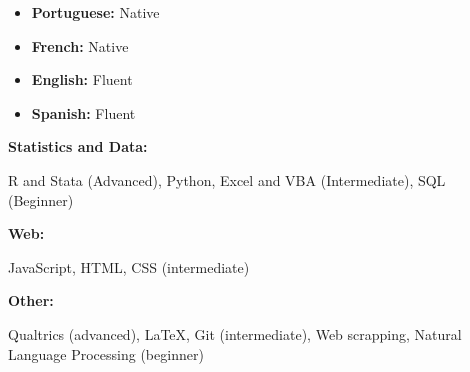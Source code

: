\documentclass[9pt]{developercv} %
\begin{document}
\vspace{-10 pt}
\begin{minipage}[t]{0.25\textwidth}
	\vspace{-15pt}
    \begin{itemize}[noitemsep]
        \item \textbf{Portuguese:} Native
        \item \textbf{French:} Native
        \item \textbf{English:} Fluent
        \item \textbf{Spanish:} Fluent
        \end{itemize}
\end{minipage}
\hfill %
\begin{minipage}[t]{0.72\textwidth}
    \vspace{-6pt}
    
    \begin{minipage}[t]{0.23\textwidth}
        \textbf{Statistics and Data:}
    \end{minipage}
    \hfill
    \begin{minipage}[t]{0.7\textwidth}
      R and Stata (Advanced), Python, Excel and VBA (Intermediate), SQL (Beginner)
    \end{minipage}
    \vspace{1mm}
    
    \begin{minipage}[t]{0.23\textwidth}
        \textbf{Web:}
    \end{minipage}
    \hfill
    \begin{minipage}[t]{0.71\textwidth}
JavaScript, HTML, CSS (intermediate)
    \end{minipage}
    \begin{minipage}[t]{0.23\textwidth}
        \textbf{Other:}
    \end{minipage}
    \hfill
    \begin{minipage}[t]{0.71\textwidth}
Qualtrics (advanced),  \LaTeX, Git (intermediate), Web scrapping, Natural Language Processing (beginner)
    \end{minipage}
\end{minipage}
\end{document}
